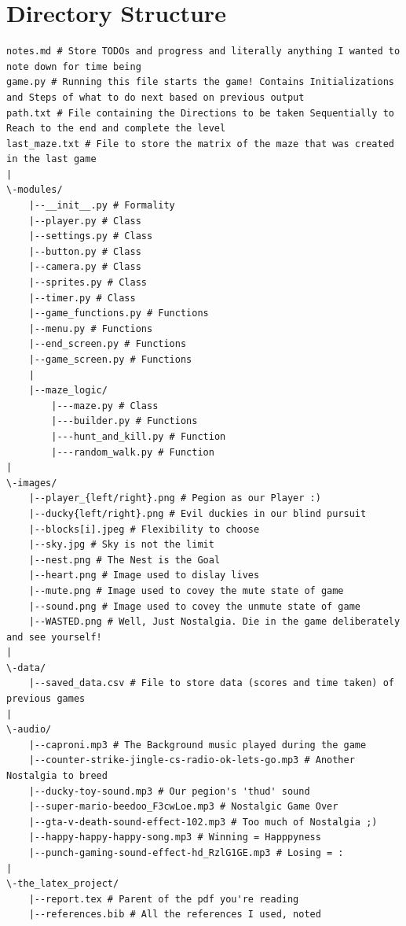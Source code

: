 \documentclass{article}
\begin{document}
\section{Directory Structure}
\begin{lstlisting}
notes.md # Store TODOs and progress and literally anything I wanted to note down for time being
game.py # Running this file starts the game! Contains Initializations and Steps of what to do next based on previous output
path.txt # File containing the Directions to be taken Sequentially to Reach to the end and complete the level
last_maze.txt # File to store the matrix of the maze that was created in the last game
|
\-modules/
    |--__init__.py # Formality
    |--player.py # Class
    |--settings.py # Class
    |--button.py # Class
    |--camera.py # Class
    |--sprites.py # Class
    |--timer.py # Class
    |--game_functions.py # Functions
    |--menu.py # Functions
    |--end_screen.py # Functions
    |--game_screen.py # Functions
    |
    |--maze_logic/
        |---maze.py # Class
        |---builder.py # Functions
        |---hunt_and_kill.py # Function
        |---random_walk.py # Function
|
\-images/
    |--player_{left/right}.png # Pegion as our Player :)
    |--ducky{left/right}.png # Evil duckies in our blind pursuit
    |--blocks[i].jpeg # Flexibility to choose
    |--sky.jpg # Sky is not the limit
    |--nest.png # The Nest is the Goal
    |--heart.png # Image used to dislay lives
    |--mute.png # Image used to covey the mute state of game
    |--sound.png # Image used to covey the unmute state of game
    |--WASTED.png # Well, Just Nostalgia. Die in the game deliberately and see yourself!
|
\-data/
    |--saved_data.csv # File to store data (scores and time taken) of previous games
|
\-audio/
    |--caproni.mp3 # The Background music played during the game
    |--counter-strike-jingle-cs-radio-ok-lets-go.mp3 # Another Nostalgia to breed
    |--ducky-toy-sound.mp3 # Our pegion's 'thud' sound
    |--super-mario-beedoo_F3cwLoe.mp3 # Nostalgic Game Over
    |--gta-v-death-sound-effect-102.mp3 # Too much of Nostalgia ;)
    |--happy-happy-happy-song.mp3 # Winning = Happpyness
    |--punch-gaming-sound-effect-hd_RzlG1GE.mp3 # Losing = :
|
\-the_latex_project/
    |--report.tex # Parent of the pdf you're reading
    |--references.bib # All the references I used, noted
\end{lstlisting}
\end{document}
